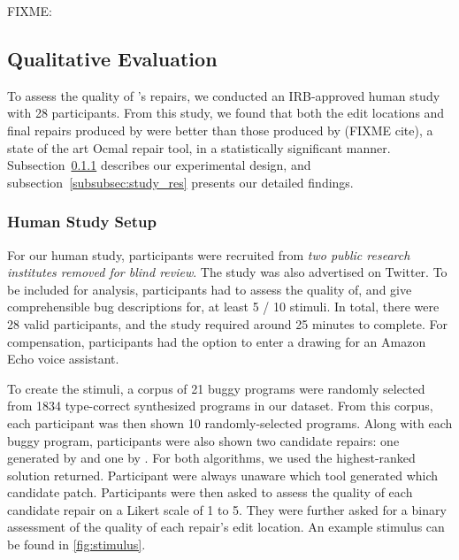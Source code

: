 FIXME: 


\subsection{Qualitative Evaluation}
\label{subsec:quan_eval}

To assess the quality of \toolname's repairs, we conducted an IRB-approved human
study with 28 participants. From this study, we found that both the edit
locations and final repairs produced by \toolname were better than those
produced by \seminal (FIXME cite), a state of the art Ocmal repair tool, in a
statistically significant manner. Subsection~\ref{subsubsec:study_setup}
describes our experimental design, and subsection~\ref{subsubsec:study_res}
presents our detailed findings.

\subsubsection{Human Study Setup}
\label{subsubsec:study_setup}


For our human study, participants were recruited from \emph{two public research
institutes removed for blind review}. The study was also advertised on Twitter.
To be included for analysis, participants had to assess the quality of, and give
comprehensible bug descriptions for, at least 5 / 10 stimuli. In total, there were
28 valid participants, and the study required around 25 minutes to complete. For
compensation, participants had the option to enter a drawing for an Amazon Echo
voice assistant.

To create the stimuli, a corpus of 21 buggy programs were randomly selected from
1834 type-correct synthesized programs in our dataset.
From this corpus, each participant was
then shown 10 randomly-selected programs. Along with each buggy program,
participants were also shown two candidate repairs: one generated by \toolname
and one by \seminal. For both algorithms, we used the highest-ranked solution
returned. Participant were always unaware which tool generated which
candidate patch. Participants were then asked to assess the quality of each
candidate repair on a Likert scale of 1 to 5. They were further asked for a
binary assessment of the quality of each repair's edit location. An example
stimulus can be found in \autoref{fig:stimulus}.

